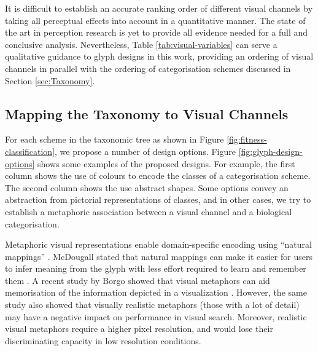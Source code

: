 It is difficult to establish an accurate ranking order of different visual channels by taking all perceptual effects into account in a quantitative manner.
The state of the art in perception research is yet to provide all evidence needed for a full and conclusive analysis.
Nevertheless, Table \ref{tab:visual-variables} can serve a qualitative guidance to glyph designs in this work, providing an ordering of visual channels in parallel with the ordering of categorisation schemes discussed in Section \ref{sec:Taxonomy}.

\subsection{Mapping the Taxonomy to Visual Channels}
\label{sec:Mapping}

For each scheme in the taxonomic tree as shown in Figure \ref{fig:fitness-classification}, we propose a number of design options.
Figure \ref{fig:glyph-design-options} shows some examples of the proposed designs.
For example, the first column shows the use of colours to encode the classes of a categorisation scheme.
The second column shows the use abstract shapes.
Some options convey an abstraction from pictorial representations of classes, and in other cases, we try to establish a metaphoric association between a visual channel and a biological categorisation.

Metaphoric visual representations enable domain-specific encoding using ``natural mappings'' \cite{siirtola05,norman02}.
McDougall \etal stated that natural mappings can make it easier for users to infer meaning from the glyph with less effort required to learn and remember them \cite{McDougall00}.
A recent study by Borgo \etal showed that visual metaphors can aid memorisation of the information depicted in a visualization \cite{Borgo12}.
However, the same study also showed that visually realistic metaphors 
(those with a lot of detail) may have a negative impact on performance in visual search.
Moreover, realistic visual metaphors require a higher pixel resolution, and would lose their discriminating capacity in low resolution conditions. 

